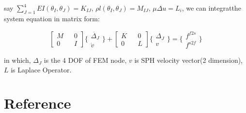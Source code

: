 \documentclass[11pt]{article}
\begin{document}
say $ \sum_{J=1}^4 EI(\theta_I,\theta_J) = K_{IJ}$, $ \rho l(\theta_I, \theta_J) = M_{IJ} $, $\mu \Delta u = L_i$, we can integratthe system equation in matrix form:


 $$ \begin{bmatrix} M && 0 \\ 0 && I \end{bmatrix} \{ \begin{array}{c} \ddot{\Delta_J} \\ \dot{v} \end{array} \} + \begin{bmatrix} K && 0 \\ 0 && L \end{bmatrix} \{ \begin{array}{c} \Delta_J \\ v \end{array} \} = \{ \begin{array}{c} f^{f2s}\\ f^{s2f} \end{array} \} $$

in which, $\Delta_J$ is the 4 DOF of FEM node, $v$ is SPH velocity vector(2 dimension), $L$ is Laplace Operator.



\section{Reference}
% 
\end{document}
